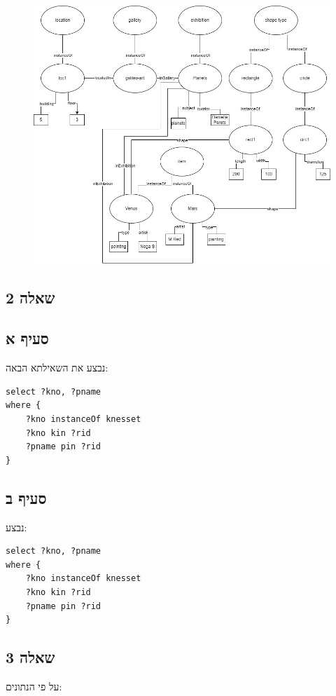 \documentclass{article}
\begin{document}
\begin{figure}[h]
    \centering
    \includegraphics[width=0.7\linewidth]{meuseum.jpg}
\end{figure}

\pagebreak

\begin{hebrew}
    \section*{שאלה 2}
    \subsection*{סעיף א}

    נבצע את השאילתא הבאה:
\end{hebrew}

\begin{lstlisting}[language=SPARQL]
select ?kno, ?pname
where {
    ?kno instanceOf knesset
    ?kno kin ?rid
    ?pname pin ?rid
}
\end{lstlisting}

\begin{hebrew}
    \subsection*{סעיף ב}
    נבצע:
\end{hebrew}

\begin{lstlisting}[language=SPARQL]
select ?kno, ?pname
where {
    ?kno instanceOf knesset
    ?kno kin ?rid
    ?pname pin ?rid
}
\end{lstlisting}

\pagebreak

\begin{hebrew}

    \section*{שאלה 3}

    על פי הנתונים:

\end{hebrew}
\end{document}
